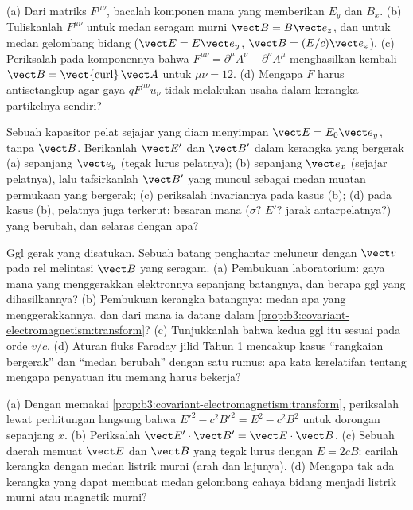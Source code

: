 \begin{exercise}[$\star$]\label{exo:b3:covariant-electromagnetism:3}
(a) Dari matriks $F^{\mu\nu}$, bacalah komponen mana yang memberikan
$E_y$ dan $B_x$. (b) Tuliskanlah $F^{\mu\nu}$ untuk medan seragam murni
$\vect B = B\vect e_z$, dan untuk medan gelombang bidang
($\vect E = E\vect e_y$, $\vect B = (E/c)\vect e_z$). (c) Periksalah
pada komponennya bahwa $F^{\mu\nu} = \partial^\mu A^\nu - \partial^\nu
A^\mu$ menghasilkan kembali $\vect B = \operatorname{\vect{curl}}\vect A$ untuk
$\mu\nu = 12$. (d) Mengapa $F$ harus antisetangkup agar gaya
$qF^{\mu\nu}u_\nu$ tidak melakukan usaha dalam kerangka partikelnya sendiri?
\end{exercise}

\begin{exercise}[$\star$]\label{exo:b3:covariant-electromagnetism:4}
Sebuah kapasitor pelat sejajar yang diam menyimpan $\vect E = E_0\vect e_y$,
tanpa $\vect B$. Berikanlah $\vect E'$ dan $\vect B'$ dalam kerangka
yang bergerak (a) sepanjang $\vect e_y$ (tegak lurus pelatnya); (b)
sepanjang $\vect
e_x$ (sejajar pelatnya), lalu tafsirkanlah $\vect B'$
yang muncul sebagai medan muatan permukaan yang bergerak; (c)
periksalah invariannya pada kasus (b); (d) pada kasus (b), pelatnya juga
terkerut: besaran mana ($\sigma$? $E'$? jarak antarpelatnya?) yang
berubah, dan selaras dengan apa?
\end{exercise}

\begin{exercise}[$\star\star$]\label{exo:b3:covariant-electromagnetism:5}
Ggl gerak yang disatukan. Sebuah batang penghantar meluncur dengan
$\vect v$ pada rel melintasi $\vect B$ yang seragam. (a) Pembukuan
laboratorium: gaya mana yang menggerakkan elektronnya sepanjang
batangnya, dan berapa ggl yang dihasilkannya? (b) Pembukuan kerangka
batangnya: medan apa yang menggerakkannya, dan dari mana ia datang
dalam \cref{prop:b3:covariant-electromagnetism:transform}? (c)
Tunjukkanlah bahwa kedua ggl itu sesuai pada orde $v/c$. (d) Aturan
fluks Faraday jilid Tahun 1 mencakup kasus ``rangkaian bergerak'' dan
``medan berubah'' dengan satu rumus: apa kata kerelatifan tentang
mengapa penyatuan itu memang harus bekerja?
\end{exercise}

\begin{exercise}[$\star\star$]\label{exo:b3:covariant-electromagnetism:6}
(a) Dengan memakai \cref{prop:b3:covariant-electromagnetism:transform},
periksalah lewat perhitungan langsung bahwa
$E'^2 - c^2B'^2 = E^2 - c^2B^2$ untuk dorongan sepanjang $x$. (b)
Periksalah $\vect E'\cdot\vect B' = \vect
E\cdot\vect B$. (c) Sebuah daerah memuat $\vect E$ dan $\vect B$ yang
tegak lurus dengan $E = 2cB$: carilah kerangka dengan medan listrik
murni (arah dan lajunya). (d) Mengapa tak ada kerangka yang dapat
membuat medan gelombang cahaya bidang menjadi listrik murni atau
magnetik murni?
\end{exercise}

